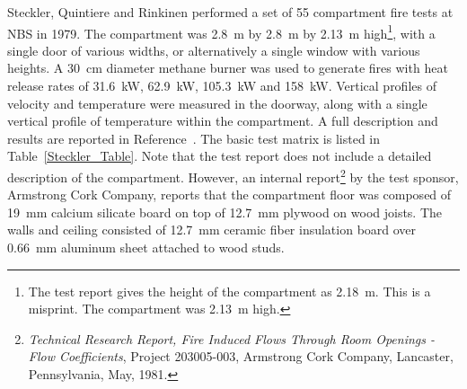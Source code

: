 Steckler, Quintiere and Rinkinen performed a set of 55 compartment fire tests at NBS in 1979. The compartment was 2.8~m by 2.8~m by 2.13~m high\footnote{The test report
gives the height of the compartment as 2.18~m. This is a misprint. The compartment was 2.13~m high.}, with a single door of
various widths, or alternatively a single window with various heights. A 30~cm diameter methane burner was used to generate fires with heat release rates of
31.6~kW, 62.9~kW, 105.3~kW and 158~kW. Vertical profiles of velocity and temperature were measured in the doorway, along with a single vertical profile of temperature
within the compartment.
A full description and results are reported in Reference~\cite{Steckler:NBSIR_82-2520}. The basic test matrix is listed in Table~\ref{Steckler_Table}. Note that the
test report does not include a detailed description of the compartment. However, an internal report\footnote{ {\em Technical Research Report, Fire Induced Flows
Through Room Openings - Flow Coefficients}, Project 203005-003, Armstrong Cork Company, Lancaster, Pennsylvania, May, 1981.} by the test sponsor, Armstrong Cork Company,
reports that the compartment floor was composed of 19~mm calcium silicate board on top of 12.7~mm plywood on wood joists. The walls and ceiling consisted of
12.7~mm ceramic fiber insulation board over 0.66~mm aluminum sheet attached to wood studs.

